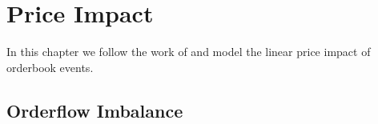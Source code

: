 \documentclass[a4paper, oneside, notitlepage]{book}
\begin{document}
\chapter{Price Impact}
%
%
%
%
%
%
%
%
In this chapter we follow the work of \cite{CONT2013} and model the linear price
impact of orderbook events.

\section{Orderflow Imbalance}
\end{document}
